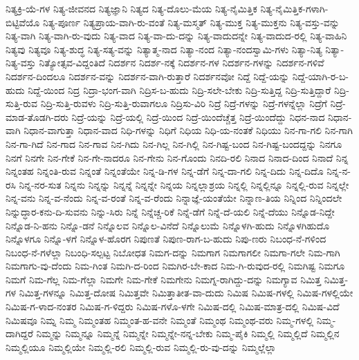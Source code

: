 {ನಿತ್ಯಕ್ರಿ-ಯೆ-ಗಳ
ನಿತ್ಯ-ಜೀವನದ
ನಿತ್ಯಜ್ಞಾನಿ
ನಿತ್ಯದ
ನಿತ್ಯ-ದೊಲು-ಮೆಯ
ನಿತ್ಯ-ನೈಮಿತ್ತಿಕ
ನಿತ್ಯ-ನೈಮಿತ್ತಿಕ-ಗಳಾಗಿ-ಬಿಟ್ಟಿವೆಯೊ
ನಿತ್ಯ-ಪೂರ್ಣ
ನಿತ್ಯಪ್ರಾಯ-ವಾಗಿ-ರು-ವಂತೆ
ನಿತ್ಯ-ಮಸ್ಮತ್
ನಿತ್ಯ-ಮುಕ್ತ
ನಿತ್ಯ-ಮುಕ್ತನು
ನಿತ್ಯ-ವಸ್ತು-ವನ್ನು
ನಿತ್ಯ-ವಾಗಿ
ನಿತ್ಯ-ವಾಗಿ-ರು-ವುದು
ನಿತ್ಯ-ವಾದ
ನಿತ್ಯ-ವಾ-ದು-ದನ್ನು
ನಿತ್ಯ-ವಾದುದನ್ನೇ
ನಿತ್ಯ-ವಾದುದ-ರಲ್ಲಿ
ನಿತ್ಯ-ವಾಹಿನಿ
ನಿತ್ಯವು
ನಿತ್ಯವೂ
ನಿತ್ಯ-ಶುದ್ಧ
ನಿತ್ಯ-ಸತ್ಯ-ವನ್ನು
ನಿತ್ಯಾತ್ಮ-ನಾದ
ನಿತ್ಯಾ-ನಂದ
ನಿತ್ಯಾ-ನಂದಸ್ವಾಮಿ-ಗಳು
ನಿತ್ಯಾ-ನಿತ್ಯ
ನಿತ್ಯಾ-ನಿತ್ಯ-ವಸ್ತು
ನಿತ್ಯೋತ್ಸವ-ವಿದ್ದಂತಿದೆ
ನಿದರ್ಶನ
ನಿದರ್ಶ-ನಕ್ಕೆ
ನಿದರ್ಶನ-ಗಳ
ನಿದರ್ಶನ-ಗಳನ್ನು
ನಿದರ್ಶನ-ಗಳಿವೆ
ನಿದರ್ಶನ-ದಿಂದಲೂ
ನಿದರ್ಶನ-ವನ್ನು
ನಿದರ್ಶನ-ವಾಗಿ-ರುತ್ತಾರೆ
ನಿದರ್ಶನವೋ
ನಿದ್ದೆ
ನಿದ್ದೆ-ಯನ್ನು
ನಿದ್ದೆ-ಯಾಗಿ-ರ-ಬ-ಹುದು
ನಿದ್ದೆ-ಯಿಂದ
ನಿದ್ರ
ನಿದ್ರಾ-ಭಂಗ-ವಾಗಿ
ನಿದ್ರಿಸ-ಬ-ಹುದು
ನಿದ್ರಿ-ಸಲೇ-ಬೇಕು
ನಿದ್ರಿ-ಸುತ್ತಿದ್ದ
ನಿದ್ರಿ-ಸುತ್ತಿದ್ದಾರೆ
ನಿದ್ರಿ-ಸುತ್ತಿ-ರುವ
ನಿದ್ರಿ-ಸುತ್ತಿ-ರುವಳು
ನಿದ್ರಿ-ಸುತ್ತಿ-ರುವಾಗಲೂ
ನಿದ್ರಿಸು-ವಿರಿ
ನಿದ್ರೆ
ನಿದ್ರೆ-ಗಳನ್ನು
ನಿದ್ರೆ-ಗಳನ್ನೆಲ್ಲಾ
ನಿದ್ರೆಗೆ
ನಿದ್ರೆ-ಮಾಡ-ತೊಡಗಿ-ದರು
ನಿದ್ರೆ-ಯನ್ನು
ನಿದ್ರೆ-ಯಲ್ಲಿ
ನಿದ್ರೆ-ಯಿಂದ
ನಿದ್ರೆ-ಯಿಂದೆಚ್ಚೆತ್ತ
ನಿದ್ರೆ-ಯಿಂದೆದ್ದು
ನಿಧನ-ನಾದ
ನಿಧಾನ-ವಾಗಿ
ನಿಧಾನ-ವಾಗುತ್ತಾ
ನಿಧಾನ-ವಾದ
ನಿಧಿ-ಗಳನ್ನು
ನಿಧಿಗೆ
ನಿಧಿಯ
ನಿಧಿ-ಯ-ನಂತಕೆ
ನಿಧಿಯು
ನಿನ-ಗಾ-ಗಲಿ
ನಿನ-ಗಾಗಿ
ನಿನ-ಗಾ-ಗಿದೆ
ನಿನ-ಗಾದ
ನಿನ-ಗಾವ
ನಿನ-ಗಿದು
ನಿನ-ಗಿಲ್ಲ
ನಿನ-ಗಿಲ್ಲಿ
ನಿನ-ಗಿಷ್ಟ-ಬಂದ
ನಿನ-ಗಿಷ್ಟ-ಬಂದದ್ದನ್ನು
ನಿನಗೂ
ನಿನಗೆ
ನಿನಗೇ
ನಿನ-ಗೇಕೆ
ನಿನ-ಗೇ-ನಾದರೂ
ನಿನ-ಗೇನು
ನಿನ-ಗೊಂದು
ನಿನದಿ-ರಲಿ
ನಿನಾದ
ನಿನಾದ-ದಿಂದ
ನಿನಾದೆ
ನಿನ್ನ
ನಿನ್ನಂತಹ
ನಿನ್ನಂತಿ-ರುವ
ನಿನ್ನಂತೆ
ನಿನ್ನಂತೆಯೇ
ನಿನ್ನ-ಡಿ-ಗಳ
ನಿನ್ನ-ಡೆಗೆ
ನಿನ್ನ-ದಾ-ಗಲಿ
ನಿನ್ನ-ದಿದು
ನಿನ್ನ-ದಿದೊ
ನಿನ್ನ-ನ-ರಸಿ
ನಿನ್ನ-ನರ-ಸುತ
ನಿನ್ನನು
ನಿನ್ನನ್ನು
ನಿನ್ನನ್ನೆ
ನಿನ್ನನ್ನೇ
ನಿನ್ನಯ
ನಿನ್ನಲ್ಲಾಶ್ರಯ
ನಿನ್ನಲ್ಲಿ
ನಿನ್ನಲ್ಲಿನ್ನೂ
ನಿನ್ನಲ್ಲಿ-ರುವ
ನಿನ್ನಲ್ಲೇ
ನಿನ್ನ-ವನು
ನಿನ್ನ-ವ-ನೆಂದು
ನಿನ್ನ-ವ-ರಂತೆ
ನಿನ್ನ-ವ-ರೆಂದು
ನಿನ್ನಾಜ್ಞೆ-ಯಂತೆಯೇ
ನಿನ್ನಾಣ-ತಿಯ
ನಿನ್ನಿಂದ
ನಿನ್ನಿಂದಲೇ
ನಿನ್ನುದ್ಧಾರ-ಕನು-ದಿ-ಸುವನು
ನಿನ್ನು-ಸಿರು
ನಿನ್ನೆ
ನಿನ್ನೆಚ್ಚ-ರಿಕೆ
ನಿನ್ನೆ-ಡೆಗೆ
ನಿನ್ನೆ-ದೆ-ಯಲಿ
ನಿನ್ನೆ-ದೆಯು
ನಿನ್ನೊಡ-ನಿದ್ದೇ
ನಿನ್ನೊಡ-ನಿ-ಹನು
ನಿನ್ನೊ-ಡನೆ
ನಿನ್ನೊಲವ
ನಿನ್ನೊಲ-ವಿನೆದೆ
ನಿನ್ನೊಲುಮೆ
ನಿನ್ನೊಳಗಿ-ಹುದು
ನಿನ್ನೊಳಗಿಹುದೊ
ನಿನ್ನೊಳಗೂ
ನಿನ್ನೊ-ಳಗೆ
ನಿನ್ನೊಳ-ಹೊರಗ
ನಿಪುಣತೆ
ನಿಪುಣ-ರಾಗ-ಬ-ಹುದು
ನಿಪು-ಣರು
ನಿಬಂಧ-ನೆ-ಗಳಿಂದ
ನಿಬಂಧ-ನೆ-ಗಳೆಲ್ಲಾ
ನಿಬಂಧಿ-ಸಲ್ಪಟ್ಟ
ನಿಬೋಧತ
ನಿಮಗ-ದನ್ನು
ನಿಮಗಾಗ
ನಿಮಗಾಗಲೀ
ನಿಮಗಾ-ಗಲೇ
ನಿಮ-ಗಾಗಿ
ನಿಮಗಾಗು-ವು-ದೆಂದು
ನಿಮ-ಗಿಂತ
ನಿಮಗಿ-ದ-ರಿಂದ
ನಿಮಗಿರ-ಬೇ-ಕಾದ
ನಿಮ-ಗಿ-ರುವುದ-ರಲ್ಲಿ
ನಿಮಗಿಷ್ಟ
ನಿಮಗೂ
ನಿಮಗೆ
ನಿಮ-ಗೆಲ್ಲ
ನಿಮ-ಗೆಲ್ಲಾ
ನಿಮಗೇ
ನಿಮ-ಗೇಕೆ
ನಿಮಗೇನು
ನಿಮಗ್ನ-ರಾಗಿದ್ದು-ದನ್ನು
ನಿಮಗ್ಯಾವ
ನಿಮಿತ್ತ
ನಿಮಿತ್ತ-ಗಳ
ನಿಮಿತ್ತ-ಗಳನ್ನೂ
ನಿಮಿತ್ತ-ದೋಷ
ನಿಮಿತ್ತವೇ
ನಿಮಿತ್ತಾತೀತ-ವಾ-ದುದು
ನಿಮಿಷ
ನಿಮಿಷ-ಗಳಲ್ಲಿ
ನಿಮಿಷ-ಗಳಲ್ಲಿಯೇ
ನಿಮಿಷ-ಗ-ಳಾದ-ನಂತರ
ನಿಮಿಷ-ಗ-ಳಿದ್ದರು
ನಿಮಿಷ-ಗಳೊ-ಳಗೇ
ನಿಮಿಷ-ದಲ್ಲಿ
ನಿಮಿಷ-ಮಾತ್ರ-ದಲ್ಲಿ
ನಿಮಿಷ-ವಿದೆ
ನಿಮಿಷವೂ
ನಿಮ್ನ
ನಿಮ್ಮ
ನಿಮ್ಮಂತಹ
ನಿಮ್ಮಂತ-ಹ-ವನೇ
ನಿಮ್ಮಂತೆ
ನಿಮ್ಮಂಥ
ನಿಮ್ಮಂಥ-ವರು
ನಿಮ್ಮ-ಗಳಲ್ಲಿ
ನಿಮ್ಮ-ದಾಗಿದ್ದರೆ
ನಿಮ್ಮನ್ನು
ನಿಮ್ಮನ್ನೂ
ನಿಮ್ಮನ್ನೆ
ನಿಮ್ಮನ್ನೇ
ನಿಮ್ಮನ್ನೇ-ನನ್ನ-ಬೇಕು
ನಿಮ್ಮ-ಪೈಕಿ
ನಿಮ್ಮಲ್ಲಿ
ನಿಮ್ಮಲ್ಲಿದೆ
ನಿಮ್ಮಲ್ಲಿನ
ನಿಮ್ಮಲ್ಲಿಯೂ
ನಿಮ್ಮಲ್ಲಿಯೇ
ನಿಮ್ಮಲ್ಲಿ-ರಲಿ
ನಿಮ್ಮಲ್ಲಿ-ರುವ
ನಿಮ್ಮಲ್ಲಿ-ರು-ವು-ದನ್ನು
ನಿಮ್ಮಲ್ಲೆಲ್ಲಾ
}
